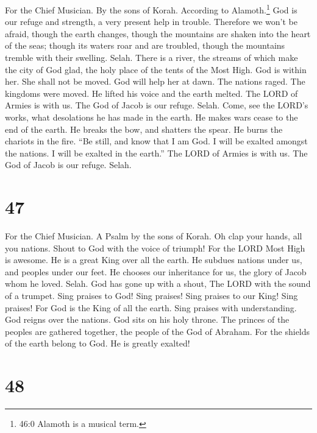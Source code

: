 For the Chief Musician. By the sons of Korah. According to
Alamoth.\footnote{46:0 Alamoth is a musical term.}  God is
our refuge and strength, a very present help in trouble. 
Therefore we won't be afraid, though the earth changes, though the
mountains are shaken into the heart of the seas;  though its
waters roar and are troubled, though the mountains tremble with their
swelling. Selah.  There is a river, the streams of which
make the city of God glad, the holy place of the tents of the Most High.
 God is within her. She shall not be moved. God will help
her at dawn.  The nations raged. The kingdoms were moved. He
lifted his voice and the earth melted.  The LORD of Armies
is with us. The God of Jacob is our refuge. Selah.  Come,
see the LORD's works, what desolations he has made in the earth.
 He makes wars cease to the end of the earth. He breaks the
bow, and shatters the spear. He burns the chariots in the fire.
 ``Be still, and know that I am God. I will be exalted
amongst the nations. I will be exalted in the earth.''  The
LORD of Armies is with us. The God of Jacob is our refuge. Selah.

\hypertarget{section-46}{%
\section{47}\label{section-46}}

For the Chief Musician. A Psalm by the sons of Korah.  Oh
clap your hands, all you nations. Shout to God with the voice of
triumph!  For the LORD Most High is awesome. He is a great
King over all the earth.  He subdues nations under us, and
peoples under our feet.  He chooses our inheritance for us,
the glory of Jacob whom he loved. Selah.  God has gone up
with a shout, The LORD with the sound of a trumpet.  Sing
praises to God! Sing praises! Sing praises to our King! Sing praises!
 For God is the King of all the earth. Sing praises with
understanding.  God reigns over the nations. God sits on his
holy throne.  The princes of the peoples are gathered
together, the people of the God of Abraham. For the shields of the earth
belong to God. He is greatly exalted!

\hypertarget{section-47}{%
\section{48}\label{section-47}}

